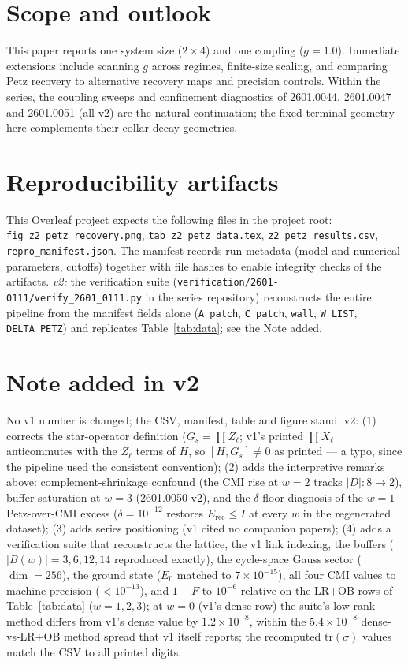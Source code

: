 \documentclass[11pt]{article}
\begin{document}
\section{Scope and outlook}

This paper reports one system size ($2\times4$) and one coupling ($g =
1.0$). Immediate extensions include scanning $g$ across regimes,
finite-size scaling, and comparing Petz recovery to alternative recovery
maps and precision controls. Within the series, the coupling sweeps and
confinement diagnostics of 2601.0044, 2601.0047 and 2601.0051 (all v2)
are the natural continuation; the fixed-terminal geometry here
complements their collar-decay geometries.

\section{Reproducibility artifacts}

This Overleaf project expects the following files in the project root:
\texttt{fig\_z2\_petz\_recovery.png}, \texttt{tab\_z2\_petz\_data.tex},
\texttt{z2\_petz\_results.csv}, \texttt{repro\_manifest.json}. The
manifest records run metadata (model and numerical parameters, cutoffs)
together with file hashes to enable integrity checks of the artifacts.
\emph{v2:} the verification suite
(\texttt{verification/2601-0111/verify\_2601\_0111.py} in the series
repository) reconstructs the entire pipeline from the manifest fields
alone (\texttt{A\_patch}, \texttt{C\_patch}, \texttt{wall},
\texttt{W\_LIST}, \texttt{DELTA\_PETZ}) and replicates
Table~\ref{tab:data}; see the Note added.

\section*{Note added in v2}
No v1 number is changed; the CSV, manifest, table and figure stand. v2:
(1) corrects the star-operator definition ($G_s = \prod Z_\ell$; v1's
printed $\prod X_\ell$ anticommutes with the $Z_\ell$ terms of $H$, so
$[H, G_s] \ne 0$ as printed --- a typo, since the pipeline used the
consistent convention); (2) adds the interpretive remarks above:
complement-shrinkage confound (the CMI rise at $w = 2$ tracks $|D|: 8
\to 2$), buffer saturation at $w = 3$ (2601.0050 v2), and the
$\delta$-floor diagnosis of the $w = 1$ Petz-over-CMI excess ($\delta = 10^{-12}$
restores $E_{\mathrm{rec}} \le I$ at every $w$ in the regenerated
dataset); (3) adds series positioning (v1 cited no companion papers);
(4) adds a verification suite that reconstructs the lattice, the v1 link
indexing, the buffers ($|B(w)| = 3, 6, 12, 14$ reproduced exactly), the
cycle-space Gauss sector ($\dim = 256$), the ground state ($E_0$ matched
to $7\times10^{-15}$), all four CMI values to machine precision
($<10^{-13}$), and $1 - F$ to $10^{-6}$ relative on the LR+OB rows of
Table~\ref{tab:data} ($w = 1, 2, 3$); at $w = 0$ (v1's dense row) the
suite's low-rank method differs from v1's dense value by
$1.2\times10^{-8}$, within the $5.4\times10^{-8}$ dense-vs-LR+OB method
spread that v1 itself reports; the recomputed $\mathrm{tr}(\sigma)$
values match the CSV to all printed digits.
\end{document}
